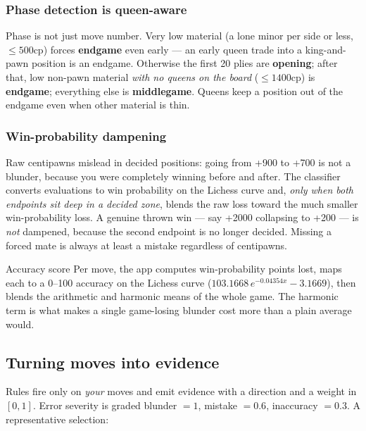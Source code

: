 \documentclass[11pt]{article}
\begin{document}
\subsubsection{Phase detection is queen-aware}
Phase is not just move number. Very low material (a lone minor per side or less,
$\leq 500$cp) forces \textbf{endgame} even early --- an early queen trade into a
king-and-pawn position is an endgame. Otherwise the first 20 plies are
\textbf{opening}; after that, low non-pawn material \emph{with no queens on the
board} ($\leq 1400$cp) is \textbf{endgame}; everything else is
\textbf{middlegame}. Queens keep a position out of the endgame even when other
material is thin.

\subsubsection{Win-probability dampening}
Raw centipawns mislead in decided positions: going from +900 to +700 is not a
blunder, because you were completely winning before and after. The classifier
converts evaluations to win probability on the Lichess curve and, \emph{only
when both endpoints sit deep in a decided zone}, blends the raw loss toward the
much smaller win-probability loss. A genuine thrown win --- say +2000 collapsing
to +200 --- is \emph{not} dampened, because the second endpoint is no longer
decided. Missing a forced mate is always at least a mistake regardless of
centipawns.

\begin{rulebox}{Accuracy score}
Per move, the app computes win-probability points lost, maps each to a 0--100
accuracy on the Lichess curve
($103.1668\,e^{-0.04354x}-3.1669$), then blends the arithmetic and harmonic
means of the whole game. The harmonic term is what makes a single game-losing
blunder cost more than a plain average would.
\end{rulebox}

\subsection{Turning moves into evidence}

Rules fire only on \emph{your} moves and emit evidence with a direction and a
weight in $[0,1]$. Error severity is graded blunder $=1$, mistake $=0.6$,
inaccuracy $=0.3$. A representative selection:
\end{document}
